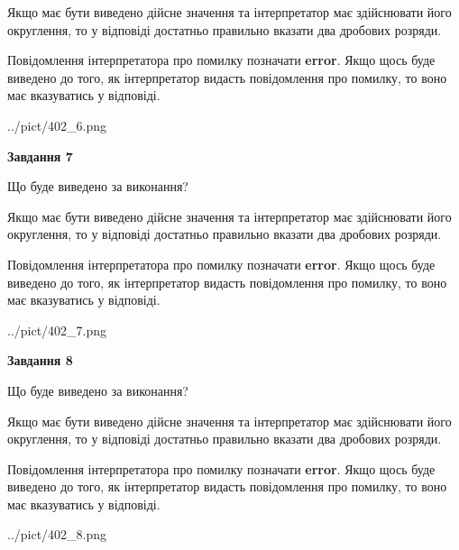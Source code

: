 \documentclass[12pt, ukrainian]{article}
\begin{document}
{\begin {Large}
Якщо має бути виведено дійсне значення та інтерпретатор має здійснювати його округлення, 
то у відповіді достатньо правильно вказати два дробових розряди.

Повідомлення інтерпретатора про помилку позначати \textbf{error}.
Якщо щось буде виведено до того, як інтерпретатор видасть повідомлення про помилку, 
то воно має вказуватись у відповіді. \par

\begin{center}
	{../pict/402_6.png}
\end{center}
\newpage

{\begin {center}\textbf{Завдання 7}\end {center}}\par
Що буде виведено за виконання? \par

Якщо має бути виведено дійсне значення та інтерпретатор має здійснювати його округлення, 
то у відповіді достатньо правильно вказати два дробових розряди.

Повідомлення інтерпретатора про помилку позначати \textbf{error}.
Якщо щось буде виведено до того, як інтерпретатор видасть повідомлення про помилку, 
то воно має вказуватись у відповіді. \par

\begin{center}
	{../pict/402_7.png}
\end{center}
\newpage

{\begin {center}\textbf{Завдання 8}\end {center}}\par
Що буде виведено за виконання? \par

Якщо має бути виведено дійсне значення та інтерпретатор має здійснювати його округлення, 
то у відповіді достатньо правильно вказати два дробових розряди.

Повідомлення інтерпретатора про помилку позначати \textbf{error}.
Якщо щось буде виведено до того, як інтерпретатор видасть повідомлення про помилку, 
то воно має вказуватись у відповіді. \par

\begin{center}
	{../pict/402_8.png}
\end{center}
\newpage


\end{Large}}
\end{document}
